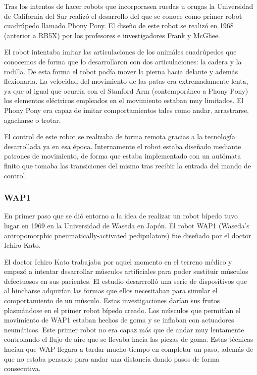 Tras los intentos de hacer robots que incorporasen ruedas u orugas la Universidad de California del Sur realizó el desarrollo del que se conoce como primer robot cuadrúpedo llamado Phony Pony. El diseño de este robot se realizó en 1968 (anterior a RB5X) por los profesores e investigadores Frank y McGhee.

\vspace{10px}

El robot intentaba imitar las articulaciones de los animáles cuadrúpedos que conocemos de forma que lo desarrollaron con dos articulaciones: la cadera y la rodilla. De esta forma el robot podía mover la pierna hacia delante y además flexionarla. La velocidad del movimiento de las patas era extremadamente lenta, ya que al igual que ocurría con el Stanford Arm (contemporáneo a Phony Pony) los elementos eléctricos empleados en el movimiento estaban muy limitados. El Phony Pony era capaz de imitar comportamientos tales como andar, arrastrarse, agacharse o trotar.

\vspace{10px}

El control de este robot se realizaba de forma remota gracias a la tecnología desarrollada ya en esa época. Internamente el robot estaba diseñado mediante patrones de movimiento, de forma que estaba implementado con un autómata finito que tomaba las transiciones del mismo tras recibir la entrada del mando de control.

\subsubsection{WAP1}
En primer paso que se dió entorno a la idea de realizar un robot bípedo tuvo lugar en 1969 en la Universidad de Waseda en Japón. El robot WAP1 (Waseda's antropomorphic pneumatically-activated pedipulators) fue diseñado por el doctor Ichiro Kato.

\vspace{10px}

El doctor Ichiro Kato trabajaba por aquel momento en el terreno médico y empezó a intentar desarrollar músculos artificiales para poder sustituir músculos defectuosos en sus pacientes. El estudio desarrrolló una serie de dispositivos que al hincharse adquirían las formas que ellos necesitaban para simular el comportamiento de un músculo. Estas investigaciones darían sus frutos plasmándose en el primer robot bípedo creado. Los músculos que permitían el movimiento de WAP1 estaban hechos de goma y se inflaban con actuadores neumáticos. Este primer robot no era capaz más que de andar muy lentamente controlando el flujo de aire que se llevaba hacia las piezas de goma. Estas técnicas hacían que WAP llegara a tardar mucho tiempo en completar un paso, además de que no estaba pensado para andar una distancia dando pasos de forma consecutiva.


